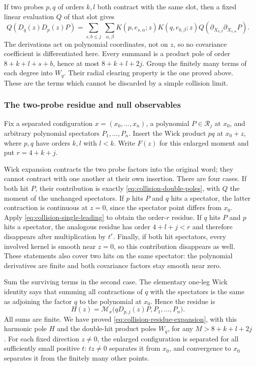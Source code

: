 If two probes $p,q$ of orders $k,l$ both contract with the same slot,
then a fixed linear evaluation $Q$ of that slot gives
\begin{equation}\label{eq:collision-double-poles}
 Q(D_q(z)D_p(z)P)=
 \sum_{s,b\leq j}\ \sum_{\alpha,\beta}
 K(p,e_{s,\alpha};z)K(q,e_{b,\beta};z)
 Q\!\left(\partial_{X_{b,\beta}}\partial_{X_{s,\alpha}}P\right).
\end{equation}
The derivations act on polynomial coordinates, not on $z$, so no
covariance coefficient is differentiated here. Every summand is a
product pole of order $8+k+l+s+b$, hence at most $8+k+l+2j$.
Group the finitely many terms of each degree into $W_q$. Their radial
clearing property is the one proved above. These are the terms which
cannot be discarded by a simple collision limit.

\subsubsection{The two-probe residue and null observables}
Fix a separated configuration $x=(x_0,\ldots,x_n)$, a polynomial
$P\in\mathcal R_j$ at $x_0$, and arbitrary polynomial spectators
$P_1,\ldots,P_n$. Insert the Wick product $p q$ at $x_0+z$, where
$p,q$ have orders $k,l$ with $l<k$. Write $F(z)$ for this enlarged
moment and put $r=4+k+j$.

Wick expansion contracts the two probe factors into the original word;
they cannot contract with one another at their own insertion. There
are four cases. If both hit $P$, their contribution is exactly
\eqref{eq:collision-double-poles}, with $Q$ the moment of the unchanged
spectators. If $p$ hits $P$ and $q$ hits a spectator, the latter
contraction is continuous at $z=0$, since the spectator point differs
from $x_0$. Apply \eqref{eq:collision-single-leading} to obtain the
order-$r$ residue. If $q$ hits $P$ and $p$ hits a spectator, the analogous
residue has order $4+l+j<r$ and therefore disappears after multiplication
by $t^r$. Finally, if both hit spectators, every involved kernel is
smooth near $z=0$, so this contribution disappears as well.
These statements also cover two hits on the same spectator: the
polynomial derivatives are finite and both covariance factors stay
smooth near zero.

Sum the surviving terms in the second case. The elementary one-leg
Wick identity says that summing all contractions of $q$ with the
spectators is the same as adjoining the factor $q$ to the polynomial
at $x_0$. Hence the residue is
\begin{equation}\label{eq:collision-two-probe-residue}
 H(z)=\mathcal M_x\bigl(qD_{p,j}(z)P,P_1,\ldots,P_n\bigr).
\end{equation}
All sums are finite. We have proved
\eqref{eq:collision-residue-expansion}, with this harmonic pole $H$
and the double-hit product poles $W_q$, for any
$M>8+k+l+2j$. For each fixed direction $z\ne0$, the enlarged
configuration is separated for all sufficiently small positive $t$:
$t z\ne0$ separates it from $x_0$, and convergence to $x_0$ separates
it from the finitely many other points.

